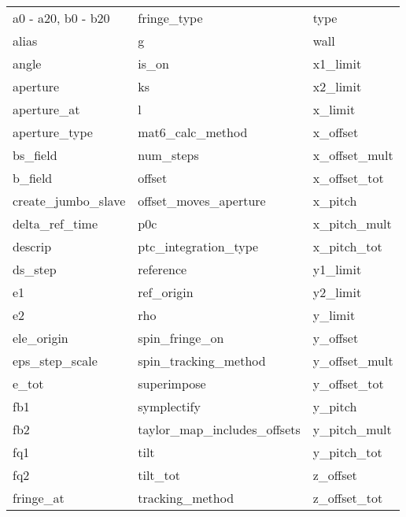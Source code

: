  \begin{tabular}{lll} \toprule
a0 - a20, b0 - b20          & fringe_type                 & type                        \\
alias                       & g                           & wall                        \\
angle                       & is_on                       & x1_limit                    \\
aperture                    & ks                          & x2_limit                    \\
aperture_at                 & l                           & x_limit                     \\
aperture_type               & mat6_calc_method            & x_offset                    \\
bs_field                    & num_steps                   & x_offset_mult               \\
b_field                     & offset                      & x_offset_tot                \\
create_jumbo_slave          & offset_moves_aperture       & x_pitch                     \\
delta_ref_time              & p0c                         & x_pitch_mult                \\
descrip                     & ptc_integration_type        & x_pitch_tot                 \\
ds_step                     & reference                   & y1_limit                    \\
e1                          & ref_origin                  & y2_limit                    \\
e2                          & rho                         & y_limit                     \\
ele_origin                  & spin_fringe_on              & y_offset                    \\
eps_step_scale              & spin_tracking_method        & y_offset_mult               \\
e_tot                       & superimpose                 & y_offset_tot                \\
fb1                         & symplectify                 & y_pitch                     \\
fb2                         & taylor_map_includes_offsets & y_pitch_mult                \\
fq1                         & tilt                        & y_pitch_tot                 \\
fq2                         & tilt_tot                    & z_offset                    \\
fringe_at                   & tracking_method             & z_offset_tot                \\
 \bottomrule
 \end{tabular}
 \vfill
 
